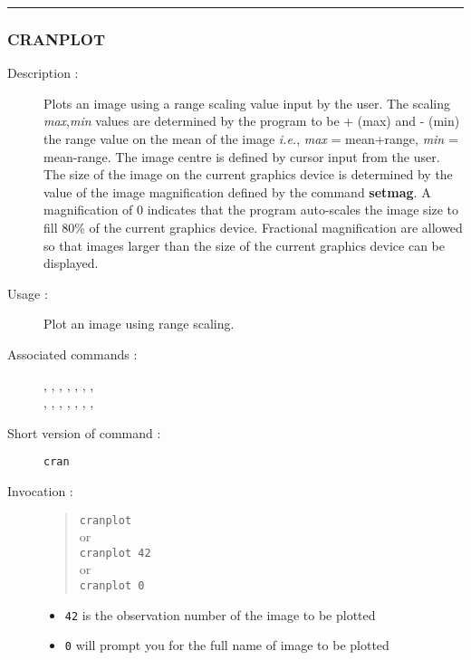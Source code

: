 \hrule
\subsubsection*{\label{CRANPLOT}CRANPLOT}

\begin{description}

\item[Description :] Plots an image using a range scaling value input
by the user.  The scaling {\it max},{\it min} values are determined by
the program to be + (max) and - (min) the range value on the mean of
the image \emph{i.e.}, {\it max} = mean+range, {\it min} = mean-range.
The image centre is defined by cursor input from the user.  The size of
the image on the current graphics device is determined by the value of
the image magnification defined by the command {\bf setmag}.  A
magnification of 0 indicates that the program auto-scales the image
size to fill 80\% of the current graphics device.  Fractional
magnification are allowed so that images larger than the size of the
current graphics device can be displayed.

\item[Usage :] Plot an image using range scaling.

\item[Associated commands :] {\tt {}},
{\tt {}}, {\tt {}},
{\tt {}}, {\tt {}},
{\tt {}}, {\tt {}}, \\
{\tt {}}, {\tt {}},
{\tt {}}, {\tt {}},
{\tt {}}, {\tt {}},
{\tt {}}, {\tt {}}

\item[Short version of command :] {\tt cran}

\item[Invocation :]

\begin{quote}{\tt cranplot}\\
or \\
{\tt cranplot 42}\\
or \\
{\tt cranplot 0}
\end{quote}

\begin{itemize}
\item {\tt 42} is the observation number of the image to be plotted
\item {\tt 0} will prompt you for the full name of image to be plotted
\end{itemize}

\end{description}

